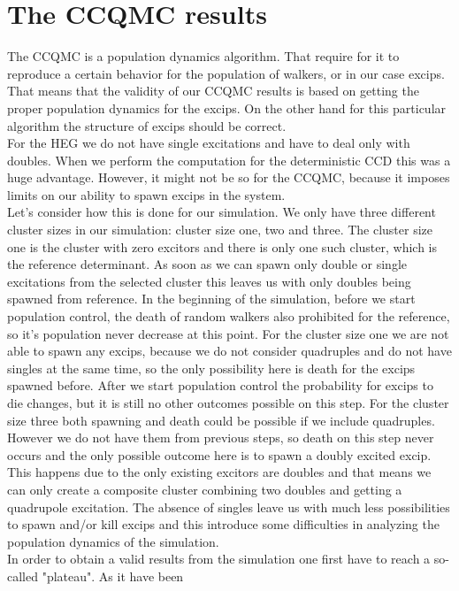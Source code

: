 \section{The CCQMC results}
The CCQMC is a population dynamics algorithm. That require for it to
reproduce a certain behavior for the population of walkers, or in our
case excips. That means that the validity of our CCQMC results is
based on getting the proper population dynamics for the excips. On the
other hand for this particular algorithm the structure of excips
should be correct. \\ For the HEG we do not have single excitations
and have to deal only with doubles. When we perform the computation
for the deterministic CCD this was a huge advantage. However, it might
not be so for the CCQMC, because it imposes limits on our ability to
spawn excips in the system. \\ Let's consider how this is done for our
simulation. We only have three different cluster sizes in our
simulation: cluster size one, two and three. The cluster size one is
the cluster with zero excitors and there is only one such cluster,
which is the reference determinant. As soon as we can spawn only double or
single excitations from the selected cluster this leaves us with only
doubles being spawned from reference. In the beginning of the simulation,
before we start population control, the death of random walkers also prohibited for the
reference, so it's population never decrease at this point. For the
cluster size one we are not able to spawn any excips, because we do
not consider quadruples and do not have singles at the same time, so
the only possibility here is death for the excips spawned
before. After we start population control the probability for excips
to die changes, but it is still no other outcomes possible on this
step. For the cluster size three both spawning and death could be
possible if we include quadruples. However we do not have them from
previous steps, so death on this step never occurs and the only
possible outcome here is to spawn a doubly excited excip. This happens
due to the only existing excitors are doubles and that means we can
only create a composite cluster combining two doubles and getting a
quadrupole excitation. The absence of singles leave us with much less
possibilities to spawn and/or kill excips and this introduce some
difficulties in analyzing the population dynamics of the
simulation.\\ In order to obtain a valid results from the simulation
one first have to reach a so-called "plateau". As it have been
